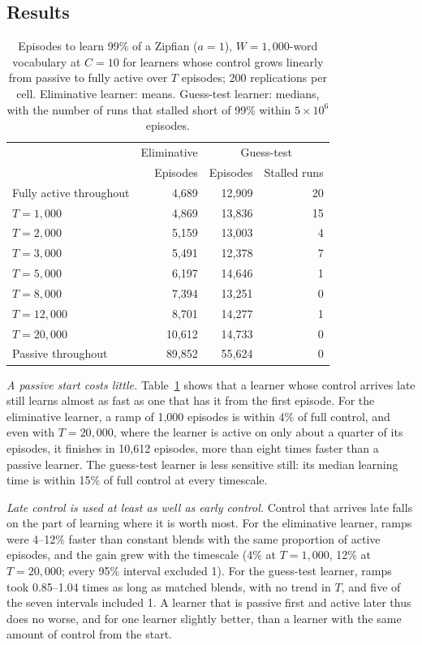 \documentclass[a4paper,natbib,man]{apa6}
\begin{document}
\subsection{Results}

\begin{table}[h]
\centering
\caption{\label{tab-ramp-fwd} Episodes to learn 99\% of a Zipfian ($a=1$), $W=1{,}000$-word vocabulary at $C=10$ for learners whose control grows linearly from passive to fully active over $T$ episodes; 200 replications per cell. Eliminative learner: means. Guess-test learner: medians, with the number of runs that stalled short of 99\% within $5 \times 10^6$ episodes.}
\begin{tabular}{lrrr}
\hline
 & Eliminative & \multicolumn{2}{c}{Guess-test} \\
 & Episodes & Episodes & Stalled runs \\
\hline
Fully active throughout & 4{,}689 & 12{,}909 & 20 \\
$T = 1{,}000$ & 4{,}869 & 13{,}836 & 15 \\
$T = 2{,}000$ & 5{,}159 & 13{,}003 & 4 \\
$T = 3{,}000$ & 5{,}491 & 12{,}378 & 7 \\
$T = 5{,}000$ & 6{,}197 & 14{,}646 & 1 \\
$T = 8{,}000$ & 7{,}394 & 13{,}251 & 0 \\
$T = 12{,}000$ & 8{,}701 & 14{,}277 & 1 \\
$T = 20{,}000$ & 10{,}612 & 14{,}733 & 0 \\
Passive throughout & 89{,}852 & 55{,}624 & 0 \\
\hline
\end{tabular}
\end{table}

\textit{A passive start costs little.} Table~\ref{tab-ramp-fwd} shows that a learner whose control arrives late still learns almost as fast as one that has it from the first episode. For the eliminative learner, a ramp of 1,000 episodes is within 4\% of full control, and even with $T=20{,}000$, where the learner is active on only about a quarter of its episodes, it finishes in 10,612 episodes, more than eight times faster than a passive learner. The guess-test learner is less sensitive still: its median learning time is within 15\% of full control at every timescale.

\textit{Late control is used at least as well as early control.} Control that arrives late falls on the part of learning where it is worth most. For the eliminative learner, ramps were 4--12\% faster than constant blends with the same proportion of active episodes, and the gain grew with the timescale (4\% at $T=1{,}000$, 12\% at $T=20{,}000$; every 95\% interval excluded 1). For the guess-test learner, ramps took 0.85--1.04 times as long as matched blends, with no trend in $T$, and five of the seven intervals included 1. A learner that is passive first and active later thus does no worse, and for one learner slightly better, than a learner with the same amount of control from the start.
\end{document}
